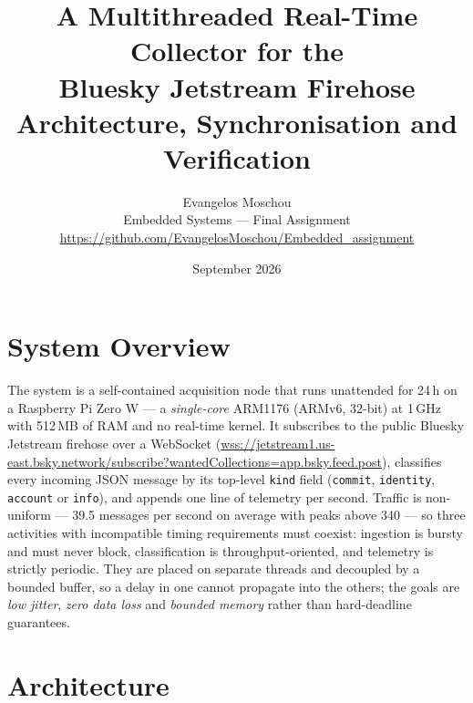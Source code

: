 \documentclass[11pt,a4paper]{article}
\title{\vspace{-1.6cm}\textbf{A Multithreaded Real-Time Collector for the\\ Bluesky Jetstream Firehose}\\[0.3em]
\large Architecture, Synchronisation and Verification}
\author{Evangelos Moschou\\[0.25em]
Embedded Systems --- Final Assignment\\[0.25em]
\small\url{https://github.com/EvangelosMoschou/Embedded_assignment}}
\date{September 2026}
\newcommand{\code}[1]{\texttt{\small #1}}
\begin{document}
\maketitle
\vspace{-1.4cm}

\section{System Overview}

The system is a self-contained acquisition node that runs unattended for 24\,h on a
Raspberry Pi Zero W --- a \emph{single-core} ARM1176 (ARMv6, 32-bit) at 1\,GHz with
512\,MB of RAM and no real-time kernel. It subscribes to the public Bluesky Jetstream
firehose over a WebSocket (\url{wss://jetstream1.us-east.bsky.network/subscribe?wantedCollections=app.bsky.feed.post}),
classifies every incoming JSON message by its top-level \code{kind} field
(\code{commit}, \code{identity}, \code{account} or \code{info}), and appends one line
of telemetry per second. Traffic is non-uniform --- 39.5 messages per second on average
with peaks above 340 --- so three activities with incompatible timing requirements must
coexist: ingestion is bursty and must never block, classification is
throughput-oriented, and telemetry is strictly periodic. They are placed on separate
threads and decoupled by a bounded buffer, so a delay in one cannot propagate into the
others; the goals are \emph{low jitter}, \emph{zero data loss} and \emph{bounded memory}
rather than hard-deadline guarantees.

\section{Architecture}
\end{document}
